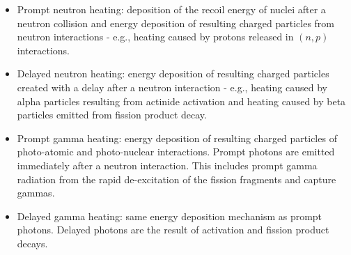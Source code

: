 \begin{itemize}
  \item Prompt neutron heating: deposition of the recoil energy of nuclei after a neutron collision and energy deposition of resulting charged particles from neutron interactions - e.g., heating caused by protons released in $(n,p)$ interactions.
  \item Delayed neutron heating: energy deposition of resulting charged particles created with a delay after a neutron interaction - e.g., heating caused by alpha particles resulting from actinide activation and heating caused by beta particles emitted from fission product decay.
  \item Prompt gamma heating: energy deposition of resulting charged particles of photo-atomic and photo-nuclear interactions. Prompt photons are emitted immediately after a neutron interaction. This includes prompt gamma radiation from the rapid de-excitation of the fission fragments and capture gammas.
  \item Delayed gamma heating: same energy deposition mechanism as prompt photons. Delayed photons are the result of activation and fission product decays.
\end{itemize}
